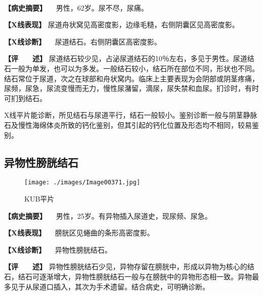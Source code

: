 \begin{figure}
    \centering
    \\
    \caption{}
    \label{fig6-3-5}
\end{figure}

\textbf{【病史摘要】} 　男性，62岁。尿不尽，尿痛。

\textbf{【X线表现】}
尿道舟状窝见高密度影，边缘毛糙，右侧阴囊区见高密度影。

\textbf{【X线诊断】} 　尿道结石。右侧阴囊区高密度影。

\textbf{【评　　述】}
尿道结石较少见，占泌尿道结石的10％左右，多见于男性。尿道结石一般为单发，也可以为多发。一般结石较小，结石所在部位不同，形状也不同。结石常位于尿道，次之在球部和舟状窝内。临床上主要表现为会阴部或阴茎疼痛，尿频，尿急，尿流变慢而无力，慢性尿潴留，滴尿，尿失禁和血尿。扪诊时，有时可扪到结石。

X线平片能诊断，所见结石与尿道平行，结石一般较小。鉴别诊断一般与阴茎静脉石及慢性海绵体炎所致的钙化鉴别，但其引起的钙化位置及形态均不相同，较易鉴别。

\subsection{异物性膀胱结石}

\begin{figure}[!htbp]
    \centering
    \texttt{[image: ./images/Image00371.jpg]}
    \captionsetup{justification=centering}
    \caption{KUB平片}
    \label{fig6-3-6}
\end{figure}

\textbf{【病史摘要】} 　男性，25岁。有异物插入尿道史，现尿频、尿急。

\textbf{【X线表现】} 　膀胱区见蜷曲的条形高密度影。

\textbf{【X线诊断】} 　异物性膀胱结石。

\textbf{【评　　述】}
异物性膀胱结石少见，异物存留在膀胱中，形成以异物为核心的结石，结石可逐渐增大，异物性膀胱结石一般与在膀胱中的异物形态相一致。异物最多见于从尿道口插入，其次为手术遗留。结合病史，可明确诊断。

